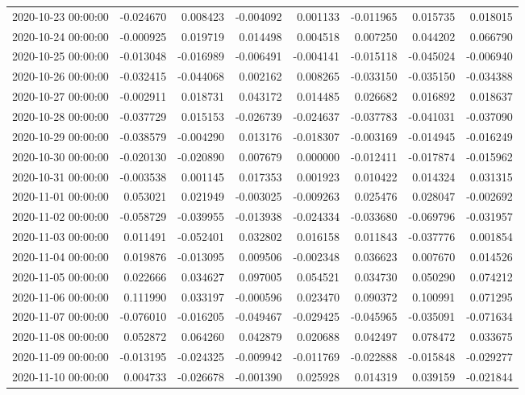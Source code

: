 \begin{tabular}{lrrrrrrr}
2020-10-23 00:00:00 & -0.024670 & 0.008423 & -0.004092 & 0.001133 & -0.011965 & 0.015735 & 0.018015 \\
2020-10-24 00:00:00 & -0.000925 & 0.019719 & 0.014498 & 0.004518 & 0.007250 & 0.044202 & 0.066790 \\
2020-10-25 00:00:00 & -0.013048 & -0.016989 & -0.006491 & -0.004141 & -0.015118 & -0.045024 & -0.006940 \\
2020-10-26 00:00:00 & -0.032415 & -0.044068 & 0.002162 & 0.008265 & -0.033150 & -0.035150 & -0.034388 \\
2020-10-27 00:00:00 & -0.002911 & 0.018731 & 0.043172 & 0.014485 & 0.026682 & 0.016892 & 0.018637 \\
2020-10-28 00:00:00 & -0.037729 & 0.015153 & -0.026739 & -0.024637 & -0.037783 & -0.041031 & -0.037090 \\
2020-10-29 00:00:00 & -0.038579 & -0.004290 & 0.013176 & -0.018307 & -0.003169 & -0.014945 & -0.016249 \\
2020-10-30 00:00:00 & -0.020130 & -0.020890 & 0.007679 & 0.000000 & -0.012411 & -0.017874 & -0.015962 \\
2020-10-31 00:00:00 & -0.003538 & 0.001145 & 0.017353 & 0.001923 & 0.010422 & 0.014324 & 0.031315 \\
2020-11-01 00:00:00 & 0.053021 & 0.021949 & -0.003025 & -0.009263 & 0.025476 & 0.028047 & -0.002692 \\
2020-11-02 00:00:00 & -0.058729 & -0.039955 & -0.013938 & -0.024334 & -0.033680 & -0.069796 & -0.031957 \\
2020-11-03 00:00:00 & 0.011491 & -0.052401 & 0.032802 & 0.016158 & 0.011843 & -0.037776 & 0.001854 \\
2020-11-04 00:00:00 & 0.019876 & -0.013095 & 0.009506 & -0.002348 & 0.036623 & 0.007670 & 0.014526 \\
2020-11-05 00:00:00 & 0.022666 & 0.034627 & 0.097005 & 0.054521 & 0.034730 & 0.050290 & 0.074212 \\
2020-11-06 00:00:00 & 0.111990 & 0.033197 & -0.000596 & 0.023470 & 0.090372 & 0.100991 & 0.071295 \\
2020-11-07 00:00:00 & -0.076010 & -0.016205 & -0.049467 & -0.029425 & -0.045965 & -0.035091 & -0.071634 \\
2020-11-08 00:00:00 & 0.052872 & 0.064260 & 0.042879 & 0.020688 & 0.042497 & 0.078472 & 0.033675 \\
2020-11-09 00:00:00 & -0.013195 & -0.024325 & -0.009942 & -0.011769 & -0.022888 & -0.015848 & -0.029277 \\
2020-11-10 00:00:00 & 0.004733 & -0.026678 & -0.001390 & 0.025928 & 0.014319 & 0.039159 & -0.021844 \\

\end{tabular}
